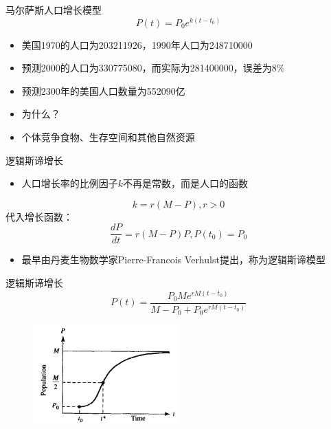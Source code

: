 \documentclass[UTF8]{ctexbeamer}
\begin{document}
\begin{frame}{马尔萨斯人口增长模型}
  \[
  P(t) = P_0e^{k(t-t_0)}
  \]
  
  \begin{itemize}
  \item 美国1970的人口为203211926，1990年人口为248710000
  \item 预测2000的人口为330775080，而实际为281400000，误差为8\%
  \item 预测2300年的美国人口数量为{\color{red}552090亿}
  \item 为什么？
  \item 个体竞争食物、生存空间和其他自然资源
  \end{itemize}
  
\end{frame}

\begin{frame}{逻辑斯谛增长}
  \begin{itemize}
  \item 人口增长率的比例因子$k$不再是常数，而是人口的函数
  \end{itemize}
  \[
  k = r(M-P), r>0
  \]
  代入增长函数：
  \[
  \frac{dP}{dt} = r(M-P)P, P(t_0) = P_0
  \]
  \begin{itemize}
  \item 最早由丹麦生物数学家Pierre-Francois Verhulst提出，称为逻辑斯谛模型
  \end{itemize}
  
\end{frame}

\begin{frame}{逻辑斯谛增长}
  \[
  P(t) = \frac{P_0Me^{rM(t-t_0)}}{M-P_0+P_0e^{rM(t-t_0)}}
  \]

  \begin{figure}
    \centering
    \includegraphics[width=0.5\textwidth]{logi.png}
  \end{figure}

\end{frame}
\end{document}
